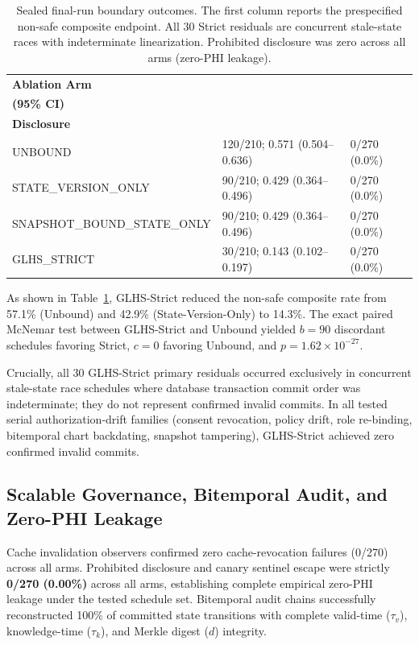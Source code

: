 \documentclass[conference]{IEEEtran}
\begin{document}
\begin{table}[t]
\caption{Sealed final-run boundary outcomes. The first column reports the prespecified non-safe composite endpoint. All 30 Strict residuals are concurrent stale-state races with indeterminate linearization. Prohibited disclosure was zero across all arms (zero-PHI leakage).}
\label{tab:results}
\centering
\scriptsize
\setlength{\tabcolsep}{2pt}
\begin{tabular}{p{}p{}p{}}
\toprule
\textbf{Ablation Arm} & \shortstack{\textbf{Original Non-Safe Composite}\\\textbf{(95\% CI)}} & \shortstack{\textbf{Prohibited}\\\textbf{Disclosure}} \\
\midrule
UNBOUND & 120/210; 0.571 (0.504--0.636) & 0/270 (0.0\%) \\
STATE\_VERSION\_ONLY & 90/210; 0.429 (0.364--0.496) & 0/270 (0.0\%) \\
SNAPSHOT\_BOUND\_STATE\_ONLY & 90/210; 0.429 (0.364--0.496) & 0/270 (0.0\%) \\
GLHS\_STRICT & 30/210; 0.143 (0.102--0.197) & 0/270 (0.0\%) \\
\bottomrule
\end{tabular}
\end{table}

As shown in Table~\ref{tab:results}, GLHS-Strict reduced the non-safe composite rate from 57.1\% (Unbound) and 42.9\% (State-Version-Only) to 14.3\%. The exact paired McNemar test between GLHS-Strict and Unbound yielded $b=90$ discordant schedules favoring Strict, $c=0$ favoring Unbound, and $p=1.62\times 10^{-27}$. 

Crucially, all 30 GLHS-Strict primary residuals occurred exclusively in concurrent stale-state race schedules where database transaction commit order was indeterminate; they do not represent confirmed invalid commits. In all tested serial authorization-drift families (consent revocation, policy drift, role re-binding, bitemporal chart backdating, snapshot tampering), GLHS-Strict achieved zero confirmed invalid commits.

\subsection{Scalable Governance, Bitemporal Audit, and Zero-PHI Leakage}
Cache invalidation observers confirmed zero cache-revocation failures (0/270) across all arms. Prohibited disclosure and canary sentinel escape were strictly \textbf{0/270 (0.00\%)} across all arms, establishing complete empirical zero-PHI leakage under the tested schedule set. Bitemporal audit chains successfully reconstructed 100\% of committed state transitions with complete valid-time ($\tau_v$), knowledge-time ($\tau_k$), and Merkle digest ($d$) integrity.
\end{document}
